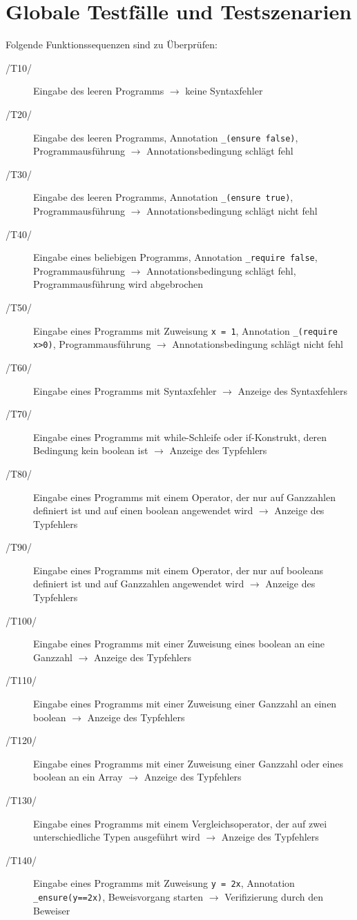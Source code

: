 \documentclass[a4paper,10pt]{article}
\begin{document}
\section{Globale Testfälle und Testszenarien}
Folgende Funktionssequenzen sind zu Überprüfen:
\begin{description}
\item[/T10/] Eingabe des leeren Programms $\to$ keine Syntaxfehler
\item[/T20/] Eingabe des leeren Programms, Annotation \texttt{\_(ensure false)}, Programmausführung $\to$ Annotationsbedingung schlägt fehl
\item[/T30/] Eingabe des leeren Programms, Annotation \texttt{\_(ensure true)}, Programmausführung $\to$ Annotationsbedingung schlägt nicht fehl
\item[/T40/] Eingabe eines beliebigen Programms, Annotation \texttt{\_require false}, Programmausführung $\to$ Annotationsbedingung schlägt fehl, Programmausführung wird abgebrochen
\item[/T50/] Eingabe eines Programms mit Zuweisung \texttt{x = 1}, Annotation \texttt{\_(require x>0)}, Programmausführung $\to$ Annotationsbedingung schlägt nicht fehl
\item[/T60/] Eingabe eines Programms mit Syntaxfehler $\to$ Anzeige des Syntaxfehlers
\item[/T70/] Eingabe eines Programms mit while-Schleife oder if-Konstrukt, deren Bedingung kein boolean ist $\to$ Anzeige des Typfehlers
\item[/T80/] Eingabe eines Programms mit einem Operator, der nur auf Ganzzahlen definiert ist und auf einen boolean angewendet wird $\to$ Anzeige des Typfehlers
\item[/T90/] Eingabe eines Programms mit einem Operator, der nur auf booleans definiert ist und auf Ganzzahlen angewendet wird $\to$ Anzeige des Typfehlers
\item[/T100/] Eingabe eines Programms mit einer Zuweisung eines boolean an eine Ganzzahl $\to$ Anzeige des Typfehlers
\item[/T110/] Eingabe eines Programms mit einer Zuweisung einer Ganzzahl an einen boolean $\to$ Anzeige des Typfehlers
\item[/T120/] Eingabe eines Programms mit einer Zuweisung einer Ganzzahl oder eines boolean an ein Array $\to$ Anzeige des Typfehlers
\item[/T130/] Eingabe eines Programms mit einem Vergleichsoperator, der auf zwei unterschiedliche Typen ausgeführt wird $\to$ Anzeige des Typfehlers
\item[/T140/] Eingabe eines Programms mit Zuweisung \texttt{y = 2x}, Annotation \texttt{\_ensure(y==2x)}, Beweisvorgang starten $\to$ Verifizierung durch den Beweiser

\end{description}
\end{document}

